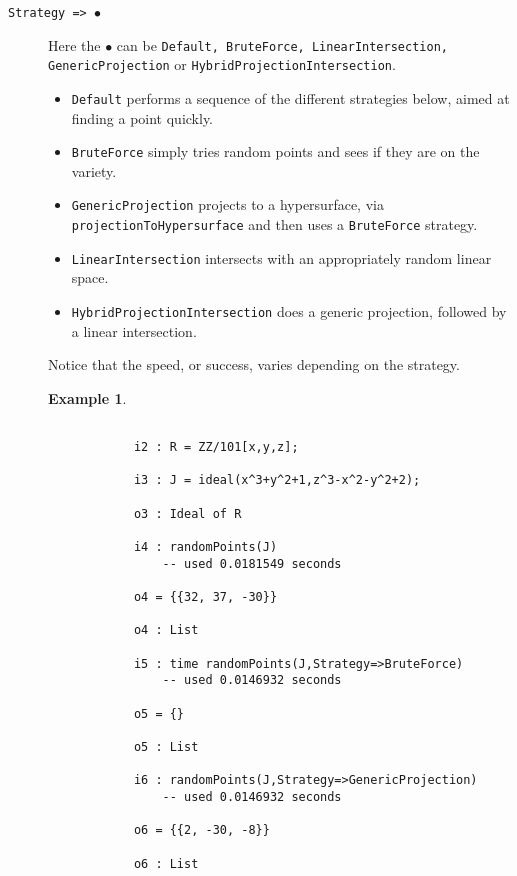 \documentclass[11pt]{amsart}
\theoremstyle{definition}
\newtheorem{example}{Example}[section]
\begin{document}
\begin{description}		
	\item[\tt Strategy => $\bullet$]   Here the $\bullet$ can be {\tt Default, BruteForce, LinearIntersection, \\ GenericProjection} or {\tt HybridProjectionIntersection}.

	\begin{itemize}
		\item {\tt Default} performs a sequence of the different strategies below, aimed at finding a point quickly.    
		\item {\tt BruteForce} simply tries random points and sees if they are on the variety.
		
		\item {\tt GenericProjection} projects to a hypersurface, via 
		{\tt projectionToHypersurface} and then uses a {\tt BruteForce} strategy.
		
		\item {\tt LinearIntersection} intersects with an appropriately random linear space.
		
		\item {\tt HybridProjectionIntersection} does a generic projection, followed by a linear intersection. 		
	\end{itemize}

	Notice that the speed, or success, varies depending on the strategy.

	\begin{example}\label{BruteForce}
		~~
		
		{{\small\color{blue}
		\begin{verbatim}

			i2 : R = ZZ/101[x,y,z];
			
			i3 : J = ideal(x^3+y^2+1,z^3-x^2-y^2+2);
			
			o3 : Ideal of R
			
			i4 : randomPoints(J)
				-- used 0.0181549 seconds

			o4 = {{32, 37, -30}}
			
			o4 : List
			
			i5 : time randomPoints(J,Strategy=>BruteForce)
				-- used 0.0146932 seconds

			o5 = {}
			
			o5 : List
			
			i6 : randomPoints(J,Strategy=>GenericProjection)
				-- used 0.0146932 seconds

			o6 = {{2, -30, -8}}
			
			o6 : List
			

\end{verbatim}}}
\end{example}
\end{description}
\end{document}
